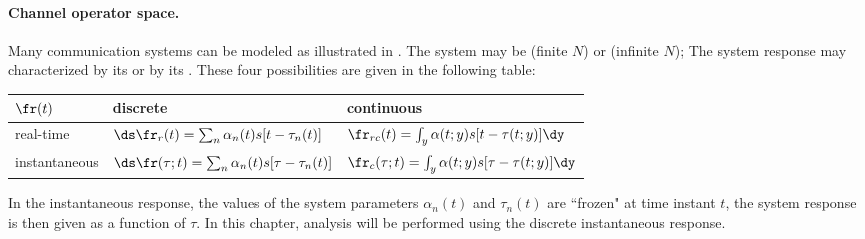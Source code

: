 \paragraph{Channel operator space.}
Many communication systems can be modeled as illustrated in 
.
The system may be  (finite $N$) 
or  (infinite $N$);
The system response may characterized by its
 or by its .
These four possibilities are given in the following table:

\begin{tabular}{| l || l | l |}
  \hline
  $\fr(t)$      & discrete & continuous \\
  \hline
  \hline
  real-time     & $\ds \fr_{r}(t)=\sum_n \alpha_n(t)s[t-\tau_n(t)]$
                & $ \fr_{rc}(t)=\int_y \alpha(t;y)s[t-\tau(t;y)]\dy$ \\
  \hline
  instantaneous & $\ds \fr(\tau;t)=\sum_n \alpha_n(t)s[\tau-\tau_n(t)]$     
                & $ \fr_c(\tau;t)=\int_y \alpha(t;y)s[\tau-\tau(t;y)]\dy$ \\
  \hline
\end{tabular}

In the instantaneous response, the values of the system parameters
$\alpha_n(t)$ and $\tau_n(t)$ are ``frozen" at time instant $t$,
the system response is then given as a function of $\tau$.
In this chapter, analysis will be performed using 
the discrete instantaneous response.


